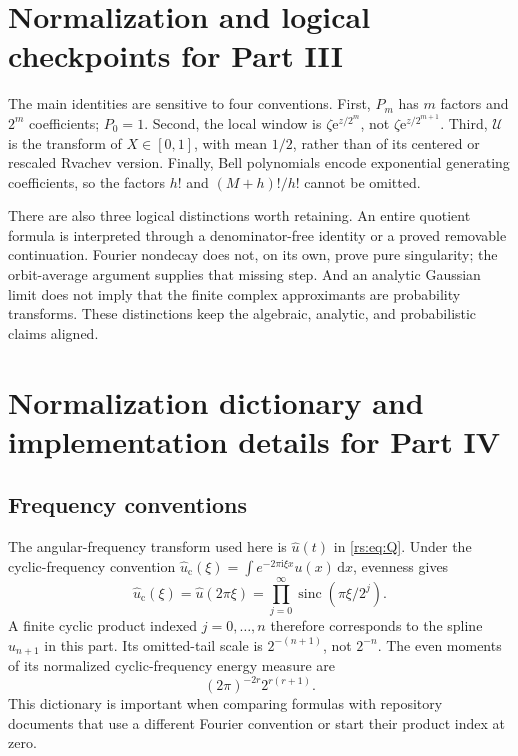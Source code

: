 \documentclass[11pt,a4paper,oneside,openany]{book}
\numberwithin{equation}{chapter}
\theoremstyle{definition}
\theoremstyle{remark}
\newcommand{\dd}{\,\mathrm d}
\newcommand{\e}{\mathrm e}
\newcommand{\ii}{\mathrm i}
\DeclareMathOperator{\sinc}{sinc}
\newcommand{\Up}{\mathcal U}
\begin{document}
\chapter{Normalization and logical checkpoints for Part III}
The main identities are sensitive to four conventions. First, \(P_m\) has \(m\) factors and \(2^m\) coefficients; \(P_0=1\). Second, the local window is \(\zeta\e^{z/2^m}\), not \(\zeta\e^{z/2^{m+1}}\). Third, \(\Up\) is the transform of \(X\in[0,1]\), with mean \(1/2\), rather than of its centered or rescaled Rvachev version. Finally, Bell polynomials encode exponential generating coefficients, so the factors \(h!\) and \((M+h)!/h!\) cannot be omitted.

There are also three logical distinctions worth retaining. An entire quotient formula is interpreted through a denominator-free identity or a proved removable continuation. Fourier nondecay does not, on its own, prove pure singularity; the orbit-average argument supplies that missing step. And an analytic Gaussian limit does not imply that the finite complex approximants are probability transforms. These distinctions keep the algebraic, analytic, and probabilistic claims aligned.
\chapter{Normalization dictionary and implementation details for Part IV}\label{rs:app:normalization}

\section{Frequency conventions}

The angular-frequency transform used here is $\widehat u(t)$ in
\eqref{rs:eq:Q}. Under the cyclic-frequency convention
$\widehat u_{\mathrm c}(\xi)=\int e^{-2\pi\ii\xi x}u(x)\dd x$, evenness gives
\begin{equation}
 \widehat u_{\mathrm c}(\xi)=\widehat u(2\pi\xi)
   =\prod_{j=0}^{\infty}\sinc(\pi\xi/2^j).
 \label{rs:eq:cyclic-frequency}
\end{equation}
A finite cyclic product indexed $j=0,\ldots,n$ therefore corresponds
to the spline $u_{n+1}$ in this part. Its omitted-tail scale is
$2^{-(n+1)}$, not $2^{-n}$. The even moments of its normalized
cyclic-frequency energy measure are
\begin{equation}
 (2\pi)^{-2r}2^{r(r+1)}.
\end{equation}
This dictionary is important when comparing formulas with
repository documents that use a different Fourier convention or
start their product index at zero.
\end{document}
